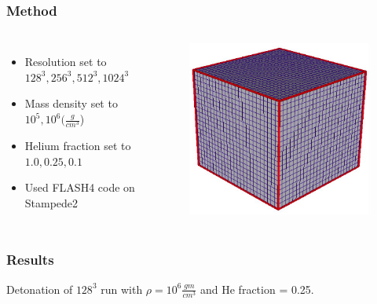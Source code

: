 \documentclass{beamer}
\begin{document}
\begin{frame}
\frametitle{Method}

\begin{columns}[c]
        \begin{itemize}
                \item Resolution set to $128^3, 256^3, 512^3, 1024^3$
                \item Mass density set to $10^5, 10^6 (\frac{g}{cm^3}$)
		\item Helium fraction set to $1.0, 0.25, 0.1$
                \item Used FLASH4 code on Stampede2
        \end{itemize}


        \vspace{25pt}
        \begin{figure}
    \begin{center}
      \includegraphics[width=.90\linewidth]{grid.png}
    \end{center}
  \end{figure}

        \end{columns}

\end{frame}



\begin{frame}
	
	\frametitle{Results}
	\begin{center}
	\end{center}
	\begin{center} 
		Detonation of $128^{3}$ run with $\rho = 10^6 \frac{gm}{cm^3}$ and He fraction = 0.25.
	\end{center}
\end{frame}

\end{document}
